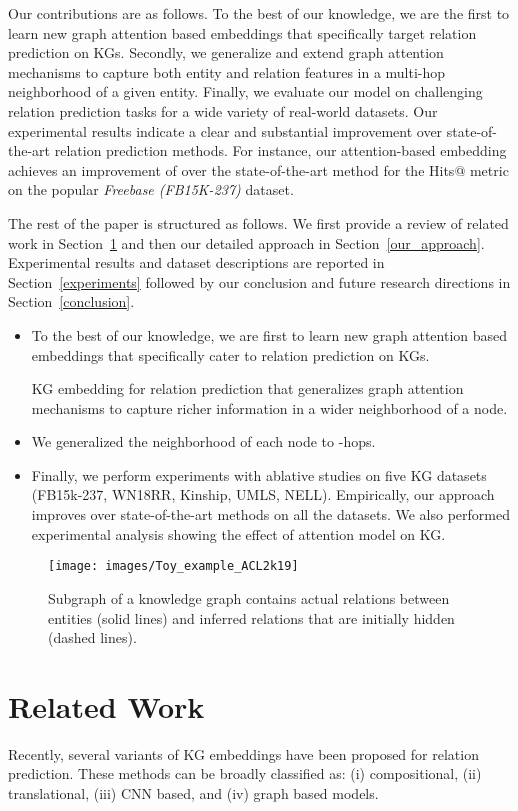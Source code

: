 \documentclass[11pt,a4paper]{article}
\begin{document}
Our contributions are as follows.
To the best of our knowledge, we are the first to learn new graph attention based embeddings that specifically target relation prediction on KGs. Secondly, we generalize and extend graph attention mechanisms to capture both entity and relation features in a multi-hop neighborhood of a given entity. Finally, we evaluate our model on challenging relation prediction tasks for a wide variety of real-world datasets. Our experimental results indicate a clear and substantial improvement over state-of-the-art relation prediction methods.
For instance, our attention-based embedding achieves an improvement of  over the state-of-the-art method for the Hits@ metric on the popular \emph{Freebase (FB15K-237)} dataset. 

The rest of the paper is structured as follows. We first provide a review of related work in Section~\ref{related_work} and then our detailed approach in Section~\ref{our_approach}. Experimental results and dataset descriptions are reported in 
Section~\ref{experiments} followed by our conclusion and future research directions in Section~\ref{conclusion}.
\begin{itemize}
	\item To the best of our knowledge, we are first to learn new graph attention based embeddings that specifically cater to relation prediction on KGs.
	
	KG embedding for relation prediction that generalizes graph attention mechanisms to capture richer information in a wider neighborhood of a node. 
	
	\item We generalized the neighborhood of each node to -hops. 
	\item Finally, we perform experiments with ablative studies on five KG datasets (FB15k-237, WN18RR, Kinship, UMLS, NELL). Empirically, our approach improves over state-of-the-art methods on all the datasets. We also performed experimental analysis showing the 
	effect of attention model on KG.
\end{itemize}
\fi

\begin{figure}
	\texttt{[image: images/Toy\_example\_ACL2k19]}
	\caption{Subgraph of a knowledge graph contains actual relations between entities (solid lines) and inferred relations that are initially hidden (dashed lines).}
	\label{fig:toys}
\end{figure}

\section{Related Work}\label{related_work}
Recently, several variants of KG embeddings have been proposed for relation prediction.
These methods can be broadly classified as: (i) compositional, (ii) translational, 
(iii) CNN based, and (iv) graph based models. 
\end{document}
